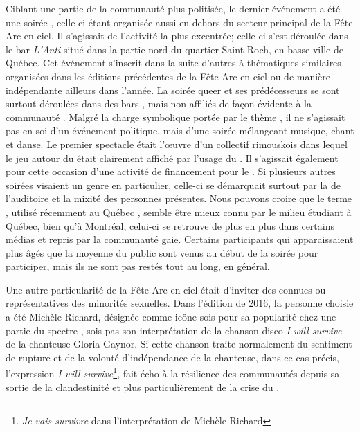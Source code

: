 Ciblant une partie de la communauté plus politisée, le dernier événement a été une soirée \qu{}, celle-ci étant organisée aussi en dehors du secteur principal de la Fête Arc-en-ciel.
Il s'agissait de l'activité la plus excentrée; celle-ci s'est déroulée dans le bar \emph{L'Anti} situé dans la partie nord du quartier Saint-Roch, en basse-ville de Québec.
Cet événement  s'inscrit dans la suite d'autres à thématiques similaires organisées dans les éditions précédentes de la Fête Arc-en-ciel ou de manière indépendante ailleurs dans l'année.
La soirée queer et ses prédécesseurs se sont surtout déroulées dans des bars , mais non affiliés de façon évidente à la communauté \lgbt.
Malgré la charge symbolique portée par le thème \qu, il ne s'agissait pas en soi d'un événement politique, mais d'une soirée mélangeant musique, chant et danse.
Le premier spectacle était l'œuvre d'un collectif \qu rimouskois dans lequel le jeu autour du  était clairement affiché par l'usage du .
Il s'agissait également pour cette occasion d'une activité de financement pour le \ggul.
Si plusieurs autres soirées visaient un genre en particulier, celle-ci se démarquait surtout par la  de l'auditoire et la mixité des personnes présentes.
Nous pouvons croire que le terme \qu, utilisé récemment au Québec \citep[voir][]{Laprade2014}, semble être mieux connu par le milieu étudiant \lgbt à Québec, bien qu'à Montréal, celui-ci se retrouve de plus en plus dans certains médias et repris par la communauté gaie.
Certains participants qui apparaissaient plus âgés que la moyenne du public sont venus au début de la soirée pour participer, mais ils ne sont pas restés tout au long, en général.

Une autre particularité de la Fête Arc-en-ciel était d'inviter des  connues ou représentatives des minorités sexuelles.
Dans l'édition de 2016, la personne choisie a été Michèle Richard, désignée comme icône sois pour sa popularité chez une partie du spectre \lgbt{}, sois pas son interprétation de la chanson disco \emph{I will survive} de la chanteuse Gloria Gaynor.
Si cette chanson traite normalement du sentiment de rupture et de la volonté d'indépendance de la chanteuse, dans ce cas précis, l'expression \emph{I will survive}\footnote{\emph{Je vais survivre} dans l'interprétation de Michèle Richard}, fait écho à la résilience des communautés \lgbt depuis sa sortie de la clandestinité et plus particulièrement de la crise du \vih{}.

